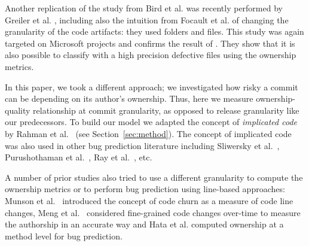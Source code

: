 


Another replication of the study from Bird et al. was recently performed by Greiler et al. \cite{Greiler:replication}, including also the intuition from Focault et al. of changing the granularity of the code artifacts: they used folders and files. This study was again targeted on Microsoft projects and confirms the result of \cite{bird:original}. They show that it is also possible to classify with a high precision defective files using the ownership metrics.

In this paper, we took a different approach; we investigated how risky a commit can be depending on its author's ownership. Thus, here we measure ownership-quality relationship at commit granularity, as opposed to release granularity like our predecessors. To build our model we adapted the concept of {\em implicated code} by Rahman et al.~\cite{Rahman:blame} (see Section~\ref{sec:method}). The concept of implicated code was also used in other bug prediction literature including Sliwersky et al.~\cite{sliwerski2005changes}, Purushothaman et al.~\cite{purushothaman2004towards}, Ray et al.~\cite{ray2015naturalness}, etc.

A number of prior studies also tried to use a different granularity to compute the ownership metrics or to perform bug prediction using line-based approaches: Munson et al.~\cite{munson1998code} introduced the concept of code churn as a measure of code line changes, Meng et al.~\cite{meng2013mining} considered fine-grained code changes over-time to measure the authorship in an accurate way and Hata et al. \cite{hata2012bug} computed ownership at a method level for bug prediction.

